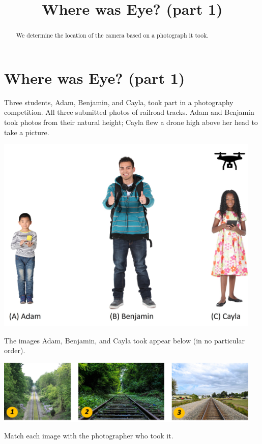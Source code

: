 \documentclass{ximera}
\title{Where was Eye? (part 1)} \license{CC BY-NC-SA 4.0}
\begin{document}
\begin{abstract}
We determine the location of the camera based on a photograph it took.
\end{abstract}
\maketitle

\section*{Where was Eye? (part 1)}

\begin{exploration}\label{exp:matchPic}
Three students, Adam, Benjamin, and Cayla, took part in a photography competition.  All three submitted photos of railroad tracks.  Adam and Benjamin took photos from their natural height; Cayla flew a drone high above her head to take a picture.
    \begin{image}
         \includegraphics[width=5in]{AdamBenjaminCayla.jpg}
\end{image}
The images Adam, Benjamin, and Cayla took appear below (in no particular order).
\begin{image}
         \includegraphics[width=5in]{threePics.jpg}
\end{image}
Match each image with the photographer who took it.


\end{exploration}
\end{document}
